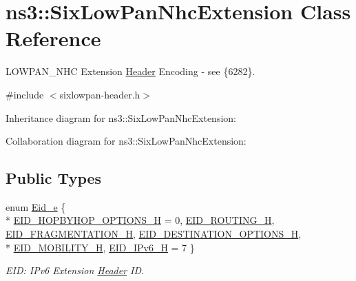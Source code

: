 \hypertarget{classns3_1_1SixLowPanNhcExtension}{}\section{ns3\+:\+:Six\+Low\+Pan\+Nhc\+Extension Class Reference}
\label{classns3_1_1SixLowPanNhcExtension}


L\+O\+W\+P\+A\+N\+\_\+\+N\+HC Extension \hyperlink{classns3_1_1Header}{Header} Encoding -\/ see \{6282\}.  




{\ttfamily \#include $<$sixlowpan-\/header.\+h$>$}



Inheritance diagram for ns3\+:\+:Six\+Low\+Pan\+Nhc\+Extension\+:


Collaboration diagram for ns3\+:\+:Six\+Low\+Pan\+Nhc\+Extension\+:
\subsection*{Public Types}
\begin{DoxyCompactItemize}
\item 
enum \hyperlink{classns3_1_1SixLowPanNhcExtension_ac692a22abe80c30bcbafa57ef36bf5ad}{Eid\+\_\+e} \{ \\*
\hyperlink{classns3_1_1SixLowPanNhcExtension_ac692a22abe80c30bcbafa57ef36bf5ada21fdd5323221baf11ca4aa76cfd75690}{E\+I\+D\+\_\+\+H\+O\+P\+B\+Y\+H\+O\+P\+\_\+\+O\+P\+T\+I\+O\+N\+S\+\_\+H} = 0, 
\hyperlink{classns3_1_1SixLowPanNhcExtension_ac692a22abe80c30bcbafa57ef36bf5adaeb4cdb5e404fc0a43e7ea60be5f24b40}{E\+I\+D\+\_\+\+R\+O\+U\+T\+I\+N\+G\+\_\+H}, 
\hyperlink{classns3_1_1SixLowPanNhcExtension_ac692a22abe80c30bcbafa57ef36bf5ada62051012ae9fe03967626d4c451f39fd}{E\+I\+D\+\_\+\+F\+R\+A\+G\+M\+E\+N\+T\+A\+T\+I\+O\+N\+\_\+H}, 
\hyperlink{classns3_1_1SixLowPanNhcExtension_ac692a22abe80c30bcbafa57ef36bf5ada874ee6f734081d5152bc6bf4ac1737c7}{E\+I\+D\+\_\+\+D\+E\+S\+T\+I\+N\+A\+T\+I\+O\+N\+\_\+\+O\+P\+T\+I\+O\+N\+S\+\_\+H}, 
\\*
\hyperlink{classns3_1_1SixLowPanNhcExtension_ac692a22abe80c30bcbafa57ef36bf5adadc134cf7c28a525ec3953173260c1166}{E\+I\+D\+\_\+\+M\+O\+B\+I\+L\+I\+T\+Y\+\_\+H}, 
\hyperlink{classns3_1_1SixLowPanNhcExtension_ac692a22abe80c30bcbafa57ef36bf5adadde190333334a82e2a0cf48c1aedf717}{E\+I\+D\+\_\+\+I\+Pv6\+\_\+H} = 7
 \}\begin{DoxyCompactList}\small\item\em E\+ID\+: I\+Pv6 Extension \hyperlink{classns3_1_1Header}{Header} ID. \end{DoxyCompactList}
\end{DoxyCompactItemize}
